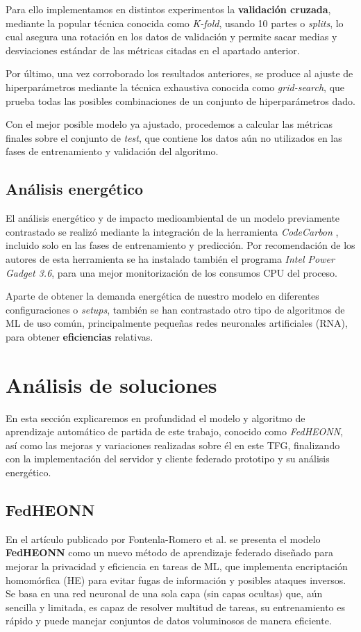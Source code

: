 \documentclass[00-Trabajo_Final.tex]{subfiles}
\begin{document}
Para ello implementamos en distintos experimentos la \textbf{validación cruzada}, mediante la popular técnica conocida como \textit{K-fold}, usando 10 partes o \textit{splits}, lo cual asegura una rotación en los datos de validación y permite sacar medias y desviaciones estándar de las métricas citadas en el apartado anterior.

Por último, una vez corroborado los resultados anteriores, se produce al ajuste de hiperparámetros mediante la técnica exhaustiva conocida como \textit{grid-search}, que prueba todas las posibles combinaciones de un conjunto de hiperparámetros dado.

Con el mejor posible modelo ya ajustado, procedemos a calcular las métricas finales sobre el conjunto de \textit{test}, que contiene los datos aún no utilizados en las fases de entrenamiento y validación del algoritmo.

\subsection*{Análisis energético}
El análisis energético y de impacto medioambiental de un modelo previamente contrastado se realizó mediante la integración de la herramienta \textit{CodeCarbon} \cite{codecarbon}, incluido solo en las fases de entrenamiento y predicción. Por recomendación de los autores de esta herramienta se ha instalado también el programa \textit{Intel Power Gadget 3.6}, para una mejor monitorización de los consumos CPU del proceso.

Aparte de obtener la demanda energética de nuestro modelo en diferentes configuraciones o \textit{setups}, también se han contrastado otro tipo de algoritmos de ML de uso común, principalmente pequeñas redes neuronales artificiales (RNA), para obtener \textbf{eficiencias} relativas.

\newpage

\section{Análisis de soluciones}
En esta sección explicaremos en profundidad el modelo y algoritmo de aprendizaje automático de partida de este trabajo, conocido como \textit{FedHEONN}, así como las mejoras y variaciones realizadas sobre él en este TFG, finalizando con la implementación del servidor y cliente federado prototipo y su análisis energético.

\subsection{FedHEONN}
En el artículo publicado por Fontenla-Romero et al. \cite{paper_FEDHEONN} se presenta el modelo \textbf{FedHEONN} como un nuevo método de aprendizaje federado diseñado para mejorar la privacidad y eficiencia en tareas de ML, que implementa encriptación homomórfica (HE) para evitar fugas de información y posibles ataques inversos. Se basa en una red neuronal de una sola capa (sin capas ocultas) que, aún sencilla y limitada, es capaz de resolver multitud de tareas, su entrenamiento es rápido y puede manejar conjuntos de datos voluminosos de manera eficiente.
\end{document}
